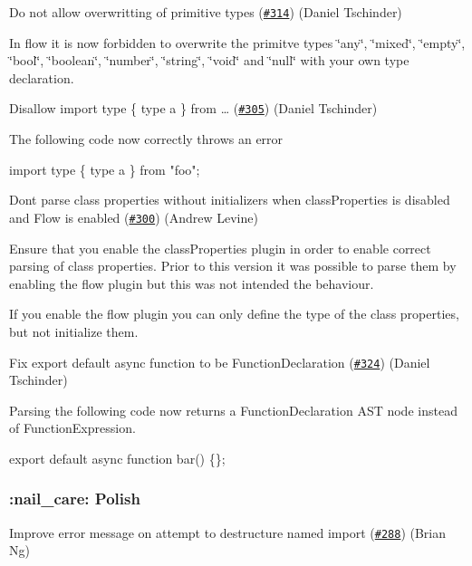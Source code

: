 Do not allow overwritting of primitive types (\href{https://github.com/babel/babylon/pull/314}{\tt \#314}) (Daniel Tschinder)

In flow it is now forbidden to overwrite the primitve types {\ttfamily \char`\"{}any\char`\"{}}, {\ttfamily \char`\"{}mixed\char`\"{}}, {\ttfamily \char`\"{}empty\char`\"{}}, {\ttfamily \char`\"{}bool\char`\"{}}, {\ttfamily \char`\"{}boolean\char`\"{}}, {\ttfamily \char`\"{}number\char`\"{}}, {\ttfamily \char`\"{}string\char`\"{}}, {\ttfamily \char`\"{}void\char`\"{}} and {\ttfamily \char`\"{}null\char`\"{}} with your own type declaration.

Disallow import type \{ type a \} from … (\href{https://github.com/babel/babylon/pull/305}{\tt \#305}) (Daniel Tschinder)

The following code now correctly throws an error


\begin{DoxyCode}
import type \{ type a \} from "foo";
\end{DoxyCode}


Don\textquotesingle{}t parse class properties without initializers when class\+Properties is disabled and Flow is enabled (\href{https://github.com/babel/babylon/pull/300}{\tt \#300}) (Andrew Levine)

Ensure that you enable the {\ttfamily class\+Properties} plugin in order to enable correct parsing of class properties. Prior to this version it was possible to parse them by enabling the {\ttfamily flow} plugin but this was not intended the behaviour.

If you enable the flow plugin you can only define the type of the class properties, but not initialize them.

Fix export default async function to be Function\+Declaration (\href{https://github.com/babel/babylon/pull/324}{\tt \#324}) (Daniel Tschinder)

Parsing the following code now returns a {\ttfamily Function\+Declaration} A\+ST node instead of {\ttfamily Function\+Expression}.


\begin{DoxyCode}
export default async function bar() \{\};
\end{DoxyCode}


\subsubsection*{\+:nail\+\_\+care\+: Polish}

Improve error message on attempt to destructure named import (\href{https://github.com/babel/babylon/pull/288}{\tt \#288}) (Brian Ng)

